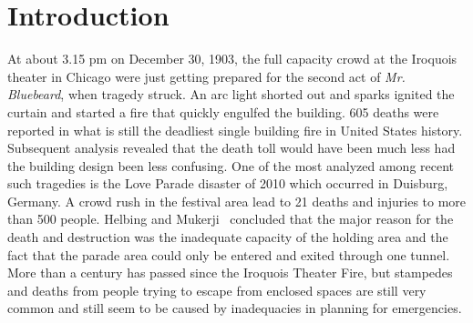 
\chapter{Introduction}
\label{chapter:Introduction}





At about 3.15 pm on December 30, 1903, the full capacity crowd at the Iroquois theater in Chicago were just getting prepared for the second act of \emph{Mr. Bluebeard}, when tragedy struck. An arc light shorted out and sparks ignited the curtain and started a fire that quickly engulfed the building. 605 deaths were reported in what is still the deadliest single building fire in United States history. Subsequent analysis revealed that the death toll would have been much less had the building design been less confusing. One of the most analyzed among recent such tragedies is the Love Parade disaster of 2010 which occurred in Duisburg, Germany. A crowd rush in the festival area lead to 21 deaths and injuries to more than 500 people. Helbing and Mukerji~\cite{Helbing:2012} concluded that the major reason for the death and destruction was the inadequate capacity of the holding area and the fact that the parade area could only be entered and exited through one tunnel. More than a century has passed since the Iroquois Theater Fire, but stampedes and deaths from people trying to escape from enclosed spaces are still very common and still seem to be caused by inadequacies in planning for emergencies.

